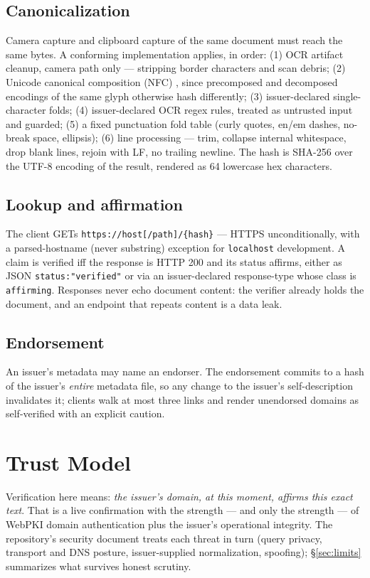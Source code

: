 \documentclass[11pt]{article}
\begin{document}
\subsection{Canonicalization}\label{sec:canon}
Camera capture and clipboard capture of the same document must reach the same
bytes. A conforming implementation applies, in order: (1) OCR artifact
cleanup, camera path only --- stripping border characters and scan debris;
(2) Unicode canonical composition (NFC) \cite{uax15}, since precomposed and
decomposed encodings of the same glyph otherwise hash differently; (3)
issuer-declared single-character folds; (4) issuer-declared OCR regex rules,
treated as untrusted input and guarded; (5) a fixed punctuation fold table
(curly quotes, en/em dashes, no-break space, ellipsis); (6) line processing
--- trim, collapse internal whitespace, drop blank lines, rejoin with LF, no
trailing newline. The hash is SHA-256 \cite{fips180} over the UTF-8 encoding
of the result, rendered as 64 lowercase hex characters.

\subsection{Lookup and affirmation}
The client GETs \texttt{https://host[/path]/\{hash\}} --- HTTPS
unconditionally, with a parsed-hostname (never substring) exception for
\texttt{localhost} development. A claim is verified iff the response is HTTP
200 and its status affirms, either as JSON \texttt{status:"verified"} or via
an issuer-declared response-type whose class is \texttt{affirming}. Responses
never echo document content: the verifier already holds the document, and an
endpoint that repeats content is a data leak.

\subsection{Endorsement}
An issuer's metadata may name an endorser. The endorsement commits to a hash
of the issuer's \emph{entire} metadata file, so any change to the issuer's
self-description invalidates it; clients walk at most three links and render
unendorsed domains as self-verified with an explicit caution.

\section{Trust Model}\label{sec:trust}

Verification here means: \emph{the issuer's domain, at this moment, affirms
this exact text}. That is a live confirmation with the strength --- and only
the strength --- of WebPKI domain authentication plus the issuer's
operational integrity. The repository's security document treats each threat
in turn (query privacy, transport and DNS posture, issuer-supplied
normalization, spoofing); \S\ref{sec:limits} summarizes what survives
honest scrutiny.
\end{document}
